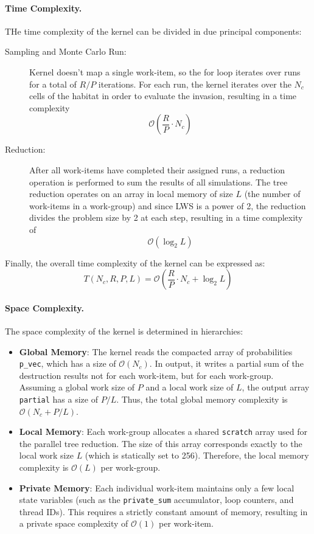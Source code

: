 \paragraph{Time Complexity.}
THe time complexity of the kernel can be divided in due principal components:
\begin{description}
    \item[Sampling and Monte Carlo Run:] Kernel doesn't map a single work-item, so the for loop iterates over runs for a total of $R/P$ iterations. For each run, the kernel iterates over the $N_c$ cells of the habitat in order to evaluate the invasion, resulting in a time complexity
    \[
    \mathcal{O}\left(\frac{R}{P} \cdot N_c\right)
    \]
    \item[Reduction:] After all work-items have completed their assigned runs, a reduction operation is performed to sum the results of all simulations. The tree reduction operates on an array in local memory of size $L$ (the number of work-items in a work-group) and since LWS is a power of 2, the reduction divides the problem size by 2 at each step, resulting in a time complexity of
    \[
    \mathcal{O}(\log_2 L)
    \]
\end{description}

\noindent
Finally, the overall time complexity of the kernel can be expressed as:
\begin{equation}
    T(N_c, R, P, L) = \mathcal{O}\left(\frac{R}{P} \cdot N_c + \log_2 L\right)
\label{eq:standard_kernel_time_complexity}
\end{equation}

\paragraph{Space Complexity.}
The space complexity of the kernel is determined in hierarchies:
\begin{itemize}
    \item \textbf{Global Memory}: The kernel reads the compacted array of probabilities \texttt{p\_vec}, which has a size of $\mathcal{O}(N_c)$. In output, it writes a partial sum of the destruction results not for each work-item, but for each work-group. Assuming a global work size of $P$ and a local work size of $L$, the output array \texttt{partial} has a size of $P/L$. Thus, the total global memory complexity is $\mathcal{O}(N_c + P/L)$.
    
    \item \textbf{Local Memory}: Each work-group allocates a shared \texttt{scratch} array used for the parallel tree reduction. The size of this array corresponds exactly to the local work size $L$ (which is statically set to 256). Therefore, the local memory complexity is $\mathcal{O}(L)$ per work-group.
    
    \item \textbf{Private Memory}: Each individual work-item maintains only a few local state variables (such as the \texttt{private\_sum} accumulator, loop counters, and thread IDs). This requires a strictly constant amount of memory, resulting in a private space complexity of $\mathcal{O}(1)$ per work-item.
\end{itemize}

